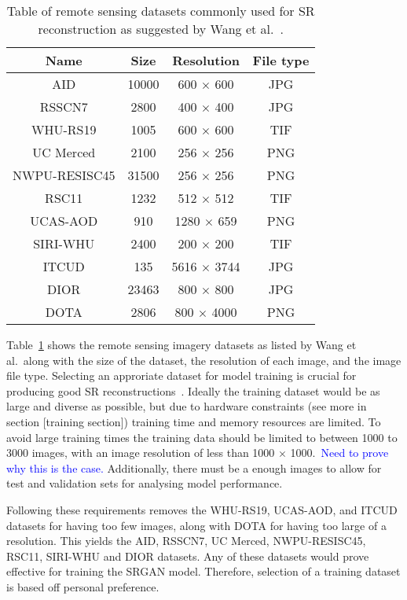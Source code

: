 \begin{table}[h]
    \centering
    \begin{tabular}{|cccc|}
        \hline
        \textbf{Name} & \textbf{Size} & \textbf{Resolution} & \textbf{File type} \\
        \hline
        AID & 10000 & 600 $\times$ 600 & JPG \\
        RSSCN7 & 2800 & 400 $\times$ 400 & JPG \\
        WHU-RS19 & 1005 & 600 $\times$ 600 & TIF \\
        UC Merced & 2100 & 256 $\times$ 256 & PNG \\
        NWPU-RESISC45 & 31500 & 256 $\times$ 256 & PNG \\
        RSC11 & 1232 & 512 $\times$ 512 & TIF \\
        UCAS-AOD & 910 & 1280 $\times$ 659 & PNG \\
        SIRI-WHU & 2400 & 200 $\times$ 200 & TIF \\
        ITCUD & 135 & 5616 $\times$ 3744 & JPG \\
        DIOR & 23463 & 800 $\times$ 800 & JPG \\
        DOTA & 2806 & 800 $\times$ 4000 & PNG \\
        \hline
    \end{tabular}
    \caption{Table of remote sensing datasets commonly used for SR reconstruction as suggested by Wang et al.~\cite{remoteSensingDeepLearningReview,remoteSensingGANsReview}.}
    \label{table:datasets_table}
\end{table}

Table~\ref{table:datasets_table} shows the remote sensing imagery datasets as listed by Wang et al.\ along with the size of the dataset, the resolution of each image, and the image file type. Selecting an approriate dataset for model training is crucial for producing good SR reconstructions~\cite{ref}. Ideally the training dataset would be as large and diverse as possible, but due to hardware constraints (see more in section [training section]) training time and memory resources are limited. To avoid large training times the training data should be limited to between 1000 to 3000 images, with an image resolution of less than 1000 $\times$ 1000.\ \textcolor{blue}{Need to prove why this is the case.} Additionally, there must be a enough images to allow for test and validation sets for analysing model performance.

Following these requirements removes the WHU-RS19, UCAS-AOD, and ITCUD datasets for having too few images, along with DOTA for having too large of a resolution. This yields the AID, RSSCN7, UC Merced, NWPU-RESISC45, RSC11, SIRI-WHU and DIOR datasets. Any of these datasets would prove effective for training the SRGAN model. Therefore, selection of a training dataset is based off personal preference. 

